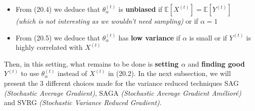 \documentclass[12pt]{report}
\begin{document}
\begin{itemize}
    \item From (20.4) we deduce that $\theta_{\alpha}^{(t)}$ is \textbf{unbiased} if $\mathbb{E}[X^{(t)}] = \mathbb{E}[Y^{(t)}]$ \textit{(which is not interesting as we wouldn't need sampling)} or if $\alpha = 1$
    \item From (20.5) we deduce that $\theta_{\alpha}^{(t)}$ has \textbf{low variance} if $\alpha$ is small or if $Y^{(t)}$ is highly correlated with $X^{(t)}$
\end{itemize}
Then, in this setting, what remains to be done is \textbf{setting $\alpha$} and \textbf{finding good $Y^{(t)}$} to use $\theta_\alpha^{(t)}$ instead of $X^{(t)}$ in (20.2). In the next subsection, we will present the $3$ different choices made for the variance reduced techniques SAG \textit{(Stochastic Average Gradient)}, SAGA \textit{(Stochastic Average Gradient Amélioré)} and SVRG \textit{(Stochastic Variance Reduced Gradient)}.
\end{document}
